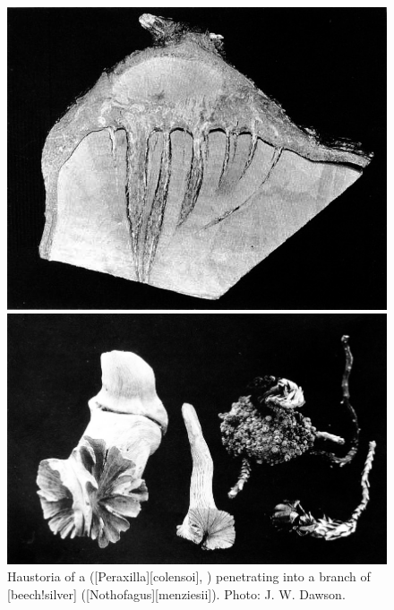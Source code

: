 \begin{figure}[!t]
	\begin{minipage}[t]{\textwidth}
		\begin{minipage}[t]{(\textwidth-\fgap) * \real{0.452}}
			\centering
			\includegraphics[width=\textwidth]{graphics/figure57mistletoe-haustoria.jpg}
			\caption[Haustoria of a korukoru]{Haustoria of a  ([Peraxilla][colensoi], ) penetrating into a branch of [beech!silver] ([Nothofagus][menziesii]).
			Photo: J. W. Dawson.}%
			\label{fig:57mistletoe-haustori}
		\end{minipage}\hspace{\fgap}%
		\begin{minipage}[t]{(\textwidth-\fgap) * \real{0.548}}
			\centering
			\includegraphics[width=\textwidth]{graphics/figure58dactylanthus.jpg}

\end{minipage}
\end{minipage}
\end{figure}
